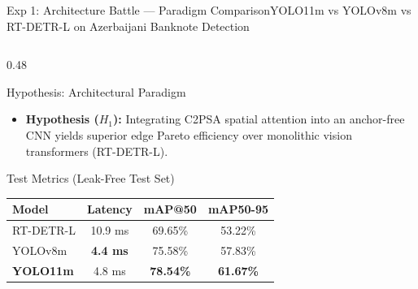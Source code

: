 
\begin{frame}{Exp 1: Architecture Battle --- Paradigm Comparison}{YOLO11m vs YOLOv8m vs RT-DETR-L on Azerbaijani Banknote Detection}
    \begin{columns}[c]
        \begin{column}{0.48\textwidth}
            \begin{techblock}{Hypothesis: Architectural Paradigm}
                \scriptsize
                \begin{itemize}\setlength{\itemsep}{2pt}
                    \item \textbf{Hypothesis ($H_1$):} Integrating C2PSA spatial attention into an anchor-free CNN yields superior edge Pareto efficiency over monolithic vision transformers (RT-DETR-L).
                \end{itemize}
            \end{techblock}
            
            \vspace{0.06cm}
            \begin{card}{Test Metrics (Leak-Free Test Set)}
                \centering
                \tiny
                \renewcommand{\arraystretch}{1.10}
                \setlength{\tabcolsep}{3.5pt}
                \begin{tabular}{l c c c}
                    \toprule
                    \textbf{Model} & \textbf{Latency} & \textbf{mAP@50} & \textbf{mAP50-95} \\
                    \midrule
                    RT-DETR-L & 10.9 ms & 69.65\% & 53.22\% \\
                    YOLOv8m & \textbf{4.4 ms} & 75.58\% & 57.83\% \\
                    \textbf{YOLO11m} & 4.8 ms & \textbf{78.54\%} & \textbf{61.67\%} \\
                    \bottomrule
                \end{tabular}
            \end{card}
            

\end{column}
\end{columns}
\end{frame}
